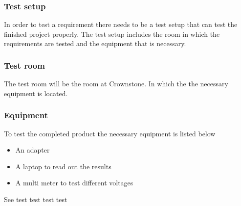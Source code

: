 \subsubsection{Test setup}
\label{sec:Test_setup}
In order to test a requirement there needs to be a test setup that can test the finished project properly. The test setup includes the room in which the requirements are tested and the equipment that is necessary.

\subsubsection{Test room}
The test room will be the room at Crownstone. In which the the necessary equipment is located.

\subsubsection{Equipment}

To test the completed product the necessary equipment is listed below

\begin{itemize}
    \item An adapter
    \item A laptop to read out the results
    \item A multi meter to test different voltages
\end{itemize}

{See }
{test}
{test}
{test}
{test}